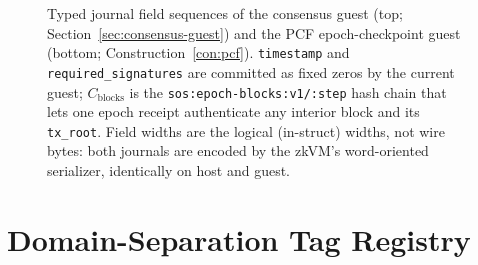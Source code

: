 \documentclass[11pt]{article}
\newcommand{\code}[1]{\texttt{#1}}
\theoremstyle{plain}
\theoremstyle{definition}
\theoremstyle{remark}
\begin{document}
\begin{figure}[ht]
{}%
\caption{Typed journal field sequences of the consensus guest (top;
Section~\ref{sec:consensus-guest}) and the PCF epoch-checkpoint guest
(bottom; Construction~\ref{con:pcf}). \code{timestamp} and
\code{required\_signatures} are committed as fixed zeros by the current
guest; $C_{\mathrm{blocks}}$ is the \code{sos:epoch-blocks:v1/:step} hash
chain that lets one epoch receipt authenticate any interior block and its
\code{tx\_root}. Field widths are the logical (in-struct) widths, not wire
bytes: both journals are encoded by the zkVM's word-oriented serializer,
identically on host and guest.}
\label{fig:wire-guest-journals}
\end{figure}

\section{Domain-Separation Tag Registry}
\label{app:domains}
\end{document}
